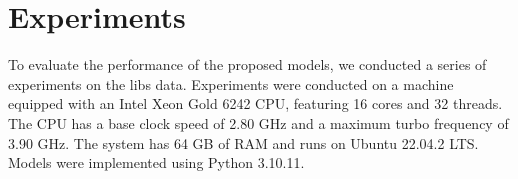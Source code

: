\section{Experiments}
To evaluate the performance of the proposed models, we conducted a series of experiments on the \gls{libs} data.
Experiments were conducted on a machine equipped with an Intel Xeon Gold 6242 CPU, featuring 16 cores and 32 threads.
The CPU has a base clock speed of 2.80 GHz and a maximum turbo frequency of 3.90 GHz.
The system has 64 GB of RAM and runs on Ubuntu 22.04.2 LTS.
Models were implemented using Python 3.10.11.


